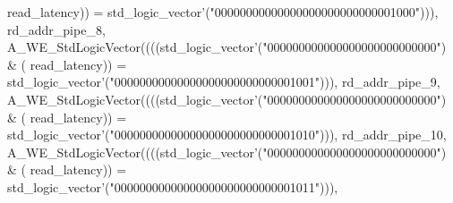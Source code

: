 \begin{DoxyCode}
{      read_latency}\textcolor{vhdlchar}{)}\textcolor{vhdlchar}{)} \textcolor{vhdlchar}{=} \textcolor{comment}{std\_logic\_vector}\textcolor{vhdlchar}{'}\textcolor{vhdlchar}{(}\textcolor{vhdllogic}{"00000000000000000000000000001000"}\textcolor{vhdlchar}{)}\textcolor{vhdlchar}{)}\textcolor{vhdlchar}{)}\textcolor{vhdlchar}{,} \textcolor{vhdlchar}{
      rd_addr_pipe_8}\textcolor{vhdlchar}{,} \textcolor{vhdlchar}{A\_WE\_StdLogicVector}\textcolor{vhdlchar}{(}\textcolor{vhdlchar}{(}\textcolor{vhdlchar}{(}\textcolor{vhdlchar}{(}\textcolor{comment}{std\_logic\_vector}\textcolor{vhdlchar}{'}\textcolor{vhdlchar}{(}\textcolor{vhdllogic}{"000000000000000000000000000"}\textcolor{vhdlchar}{)} \textcolor{vhdlchar}{&} \textcolor{vhdlchar}{(}\textcolor{vhdlchar}{
      read_latency}\textcolor{vhdlchar}{)}\textcolor{vhdlchar}{)} \textcolor{vhdlchar}{=} \textcolor{comment}{std\_logic\_vector}\textcolor{vhdlchar}{'}\textcolor{vhdlchar}{(}\textcolor{vhdllogic}{"00000000000000000000000000001001"}\textcolor{vhdlchar}{)}\textcolor{vhdlchar}{)}\textcolor{vhdlchar}{)}\textcolor{vhdlchar}{,} \textcolor{vhdlchar}{
      rd_addr_pipe_9}\textcolor{vhdlchar}{,} \textcolor{vhdlchar}{A\_WE\_StdLogicVector}\textcolor{vhdlchar}{(}\textcolor{vhdlchar}{(}\textcolor{vhdlchar}{(}\textcolor{vhdlchar}{(}\textcolor{comment}{std\_logic\_vector}\textcolor{vhdlchar}{'}\textcolor{vhdlchar}{(}\textcolor{vhdllogic}{"000000000000000000000000000"}\textcolor{vhdlchar}{)} \textcolor{vhdlchar}{&} \textcolor{vhdlchar}{(}\textcolor{vhdlchar}{
      read_latency}\textcolor{vhdlchar}{)}\textcolor{vhdlchar}{)} \textcolor{vhdlchar}{=} \textcolor{comment}{std\_logic\_vector}\textcolor{vhdlchar}{'}\textcolor{vhdlchar}{(}\textcolor{vhdllogic}{"00000000000000000000000000001010"}\textcolor{vhdlchar}{)}\textcolor{vhdlchar}{)}\textcolor{vhdlchar}{)}\textcolor{vhdlchar}{,} \textcolor{vhdlchar}{
      rd_addr_pipe_10}\textcolor{vhdlchar}{,} \textcolor{vhdlchar}{A\_WE\_StdLogicVector}\textcolor{vhdlchar}{(}\textcolor{vhdlchar}{(}\textcolor{vhdlchar}{(}\textcolor{vhdlchar}{(}\textcolor{comment}{std\_logic\_vector}\textcolor{vhdlchar}{'}\textcolor{vhdlchar}{(}\textcolor{vhdllogic}{"000000000000000000000000000"}\textcolor{vhdlchar}{)} \textcolor{vhdlchar}{&} \textcolor{vhdlchar}{(}\textcolor{vhdlchar}{
      read_latency}\textcolor{vhdlchar}{)}\textcolor{vhdlchar}{)} \textcolor{vhdlchar}{=} \textcolor{comment}{std\_logic\_vector}\textcolor{vhdlchar}{'}\textcolor{vhdlchar}{(}\textcolor{vhdllogic}{"00000000000000000000000000001011"}\textcolor{vhdlchar}{)}\textcolor{vhdlchar}{)}\textcolor{vhdlchar}{)}\textcolor{vhdlchar}{,} \textcolor{vhdlchar}{
}
\end{DoxyCode}
